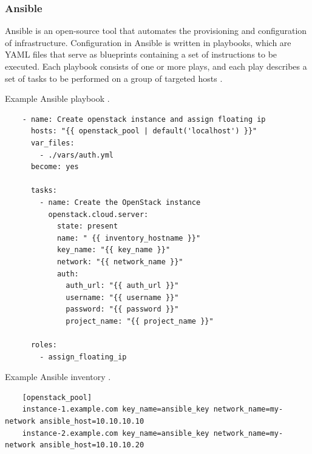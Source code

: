 
\subsubsection{Ansible}
\label{sec:ansible}

Ansible is an open-source tool that automates the provisioning and configuration of infrastructure. Configuration in Ansible is written in playbooks, which are YAML files that serve as blueprints containing a set of instructions to be executed. Each playbook consists of one or more plays, and each play describes a set of tasks to be performed on a group of targeted hosts \cite{AnsibleDocs}.

\begin{listing}[htb]
    \centering
    \caption{Example Ansible playbook \cite{AnsibleDocs}.}
    \begin{verbatim}
    - name: Create openstack instance and assign floating ip
      hosts: "{{ openstack_pool | default('localhost') }}"
      var_files:
        - ./vars/auth.yml
      become: yes
  
      tasks:
        - name: Create the OpenStack instance
          openstack.cloud.server:
            state: present
            name: " {{ inventory_hostname }}"
            key_name: "{{ key_name }}"
            network: "{{ network_name }}"
            auth:
              auth_url: "{{ auth_url }}"
              username: "{{ username }}"
              password: "{{ password }}"
              project_name: "{{ project_name }}"
  
      roles:
        - assign_floating_ip

    \end{verbatim}
    \label{lst:exampleAnsiblePlaybook}
\end{listing}

\begin{listing}[htb]
    \centering
    \caption{Example Ansible inventory \cite{AnsibleDocs}.}
    \begin{verbatim}
    [openstack_pool]
    instance-1.example.com key_name=ansible_key network_name=my-network ansible_host=10.10.10.10
    instance-2.example.com key_name=ansible_key network_name=my-network ansible_host=10.10.10.20
    \end{verbatim}
    \label{lst:exampleAnsibleInventory}
\end{listing}


